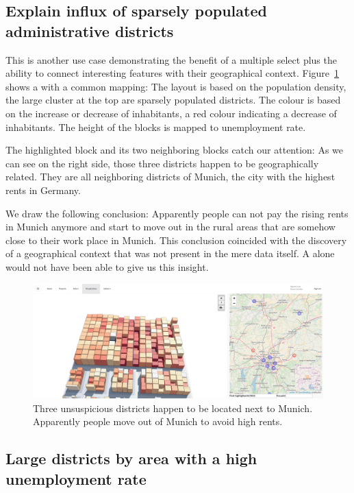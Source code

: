 \subsection{Explain influx of sparsely populated administrative districts}

This is another use case demonstrating the benefit of a multiple select plus the ability to connect interesting features with their geographical context.
Figure~\ref{fig:evaluation:cases:wahlkreise_multiselect} shows a \tmap{} with a common mapping:
The layout is based on the population density, the large cluster at the top are sparsely populated districts.
The colour is based on the increase or decrease of inhabitants, a red colour indicating a decrease of inhabitants.
The height of the blocks is mapped to unemployment rate.

The highlighted block and its two neighboring blocks catch our attention:
As we can see on the right side, those three districts happen to be geographically related.
They are all neighboring districts of Munich, the city with the highest rents in Germany.

We draw the following conclusion:
Apparently people can not pay the rising rents in Munich anymore and start to move out in the rural areas that are somehow close to their work place in Munich.
This conclusion coincided with the discovery of a geographical context that was not present in the mere data itself.
A \tmap{} alone would not have been able to give us this insight.

\begin{figure}[h]
  \centering
  \includegraphics[width=\textwidth]{figures/evaluation/cases/wahlkreise_multiselect}
  \caption{
    Three unsuspicious districts happen to be located next to Munich.
    Apparently people move out of Munich to avoid high rents.
  }\label{fig:evaluation:cases:wahlkreise_multiselect}
\end{figure}


\subsection{Large districts by area with a high unemployment rate}

